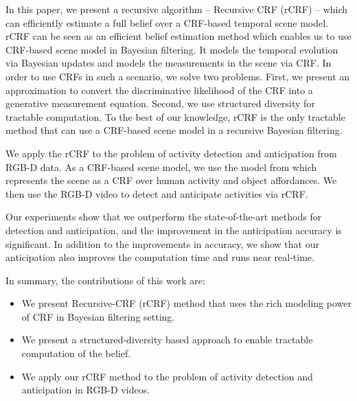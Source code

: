 In this paper, we present a recursive algorithm -- Recursive CRF (rCRF) -- which can efficiently estimate a full belief over a CRF-based temporal scene model. rCRF can be seen as an efficient belief estimation method which enables us to use CRF-based scene model in Bayesian filtering. It models the temporal evolution via Bayesian updates and models the measurements in the scene via CRF. In order to use CRFs in such a scenario, we solve two problems. First, we present an approximation to convert the discriminative likelihood of the CRF into a generative measurement equation. Second, we use structured diversity for tractable computation. To the best of our knowledge, rCRF is the only tractable method that can use a CRF-based scene model in a recursive Bayesian filtering.

We apply the rCRF to the problem of activity detection and anticipation from RGB-D data. As a CRF-based scene model, we use the model from \cite{hemaIJRR} which represents the scene as a CRF over human activity and object affordances. We then use the RGB-D video to detect and anticipate activities via rCRF. %

Our experiments show that we outperform the state-of-the-art methods for detection and anticipation, and the improvement in the anticipation accuracy is significant. In addition to the improvements in accuracy, we show that our anticipation also improves the computation time and runs near real-time.


In summary, the contributions of this work are:
\begin{itemize}
\item  We present Recursive-CRF (rCRF) method that uses the rich modeling power of CRF in
Bayesian filtering setting.
\item  We present a structured-diversity based approach to enable tractable computation of the belief.
\item  We apply our rCRF method to the problem of activity detection and anticipation in
RGB-D videos.
\end{itemize}

